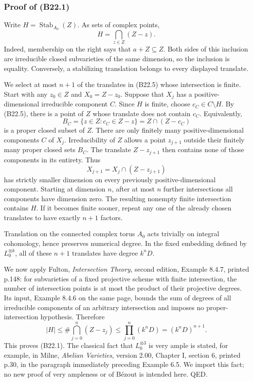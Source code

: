 \subsubsection{Proof of (B22.1)}\label{proof-of-b22.1}

Write \(H=\operatorname{Stab}_{A_0}(Z)\). As sets of complex points, \[
 H=\bigcap_{z\in Z}(Z-z).
\tag{B22.5}
\] Indeed, membership on the right says that \(a+Z\subseteq Z\). Both sides of this inclusion are irreducible closed subvarieties of the same dimension, so the inclusion is equality. Conversely, a stabilizing translation belongs to every displayed translate.

We select at most \(n+1\) of the translates in (B22.5) whose intersection is finite. Start with any \(z_0\in Z\) and \(X_0=Z-z_0\). Suppose that \(X_j\) has a positive-dimensional irreducible component \(C\). Since \(H\) is finite, choose \(c_C\in C\setminus H\). By (B22.5), there is a point of \(Z\) whose translate does not contain \(c_C\). Equivalently, \[
 B_C=\{z\in Z:c_C\in Z-z\}=Z\cap(Z-c_C)
\] is a proper closed subset of \(Z\). There are only finitely many positive-dimensional components \(C\) of \(X_j\). Irreducibility of \(Z\) allows a point \(z_{j+1}\) outside their finitely many proper closed sets \(B_C\). The translate \(Z-z_{j+1}\) then contains none of those components in its entirety. Thus \[
 X_{j+1}=X_j\cap(Z-z_{j+1})
\] has strictly smaller dimension on every previously positive-dimensional component. Starting at dimension \(n\), after at most \(n\) further intersections all components have dimension zero. The resulting nonempty finite intersection contains \(H\). If it becomes finite sooner, repeat any one of the already chosen translates to have exactly \(n+1\) factors.

Translation on the connected complex torus \(A_0\) acts trivially on integral cohomology, hence preserves numerical degree. In the fixed embedding defined by \(L_0^{\otimes k}\), all of these \(n+1\) translates have degree \(k^nD\).

We now apply Fulton, \emph{Intersection Theory}, second edition, Example 8.4.7, printed p.148: for subvarieties of a fixed projective scheme with finite intersection, the number of intersection points is at most the product of their projective degrees. Its input, Example 8.4.6 on the same page, bounds the sum of degrees of all irreducible components of an arbitrary intersection and imposes no proper-intersection hypothesis. Therefore \[
 |H|\le\#\bigcap_{j=0}^{n}(Z-z_j)
 \le\prod_{j=0}^{n}(k^nD)=(k^nD)^{n+1}.
\] This proves (B22.1). The classical fact that \(L_0^{\otimes3}\) is very ample is stated, for example, in Milne, \emph{Abelian Varieties}, version 2.00, Chapter I, section 6, printed p.30, in the paragraph immediately preceding Example 6.5. We import this fact; no new proof of very ampleness or of Bézout is intended here. QED.

